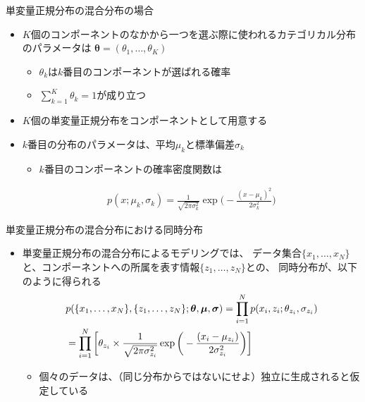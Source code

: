 \documentclass[aspectratio=169,unicode,dvipdfmx,14pt]{beamer}
\begin{document}
\begin{frame}{単変量正規分布の混合分布の場合}
\begin{itemize}
\item $K$個のコンポーネントのなかから一つを選ぶ際に使われるカテゴリカル分布のパラメータは
$\bm{\theta} = (\theta_1,\ldots,\theta_K)$
\begin{itemize}
\item $\theta_k$は$k$番目のコンポーネントが選ばれる確率
\item $\sum_{k=1}^K \theta_k = 1$が成り立つ
\end{itemize}
\item $K$個の単変量正規分布をコンポーネントとして用意する
\item $k$番目の分布のパラメータは、平均$\mu_k$と標準偏差$\sigma_k$
\begin{itemize}
\item $k$番目のコンポーネントの確率密度関数は
\end{itemize}
\begin{align}
p(x;\mu_k,\sigma_k) = \frac{1}{\sqrt{2\pi\sigma_k^2}}\exp\Big( - \frac{(x - \mu_k)^2}{2\sigma_k^2} \Big)
\end{align}
\end{itemize}
\end{frame}

\begin{frame}{単変量正規分布の混合分布における同時分布}
\begin{itemize}
\item 単変量正規分布の混合分布によるモデリングでは、
データ集合$\{x_1, \ldots, x_N\}$と、コンポーネントへの所属を表す情報$\{z_1,\ldots,z_N\}$との、
同時分布が、以下のように得られる
\vspace{-.1in}
\begin{align}
& p( \{ x_1,\ldots,x_N \}, \{ z_1,\ldots,z_N \} ;\bm{\theta},\bm{\mu},\bm{\sigma})
= \prod_{i=1}^N p(x_i, z_i ; \theta_{z_i}, \sigma_{z_i}) \notag \\ &
= \prod_{i=1}^N \bigg[ \theta_{z_i} \times \frac{1}{\sqrt{2\pi\sigma_{z_i}^2}}\exp\bigg( - \frac{(x_i - \mu_{z_i})}{2\sigma_{z_i}^2} \bigg) \bigg]
\label{eq:joint_MN}
\end{align}
\begin{itemize}
\item 個々のデータは、（同じ分布からではないにせよ）独立に生成されると仮定している
\end{itemize}
\end{itemize}
\end{frame}
\end{document}
